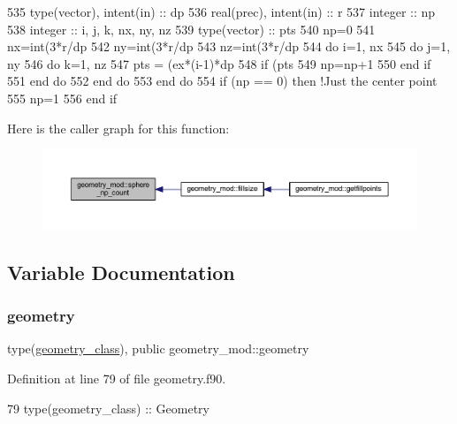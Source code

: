 \begin{DoxyCode}
535     \textcolor{keywordtype}{type}(vector), \textcolor{keywordtype}{intent(in)} :: dp
536     \textcolor{keywordtype}{real(prec)}, \textcolor{keywordtype}{intent(in)} :: r
537     \textcolor{keywordtype}{integer} :: np
538     \textcolor{keywordtype}{integer} :: i, j, k, nx, ny, nz
539     \textcolor{keywordtype}{type}(vector) :: pts
540     np=0
541     nx=int(3*r/dp%
542     ny=int(3*r/dp%
543     nz=int(3*r/dp%
544     \textcolor{keywordflow}{do} i=1, nx
545         \textcolor{keywordflow}{do} j=1, ny
546             \textcolor{keywordflow}{do} k=1, nz
547                 pts = (ex*(i-1)*dp%
548                 \textcolor{keywordflow}{if} (pts%
549                     np=np+1
550 \textcolor{keywordflow}{                end if}
551 \textcolor{keywordflow}{            end do}
552 \textcolor{keywordflow}{        end do}
553 \textcolor{keywordflow}{    end do}
554     \textcolor{keywordflow}{if} (np == 0) \textcolor{keywordflow}{then} \textcolor{comment}{!Just the center point}
555         np=1
556 \textcolor{keywordflow}{    end if}
\end{DoxyCode}
Here is the caller graph for this function\+:\nopagebreak
\begin{figure}[H]
\begin{center}
\leavevmode
\includegraphics[width=350pt]{namespacegeometry__mod_a05de7940b4e7df5a2b31f3d0414e3743_icgraph}
\end{center}
\end{figure}


\subsection{Variable Documentation}
\mbox{\label{namespacegeometry__mod_ad2ad4f7e1138beaad5f37d5c15b7b457}} 
\subsubsection{\texorpdfstring{geometry}{geometry}}
{\footnotesize\ttfamily type(\mbox{\hyperlink{structgeometry__mod_1_1geometry__class}{geometry\+\_\+class}}), public geometry\+\_\+mod\+::geometry}



Definition at line 79 of file geometry.\+f90.


\begin{DoxyCode}
79     \textcolor{keywordtype}{type}(geometry\_class) :: Geometry
\end{DoxyCode}
